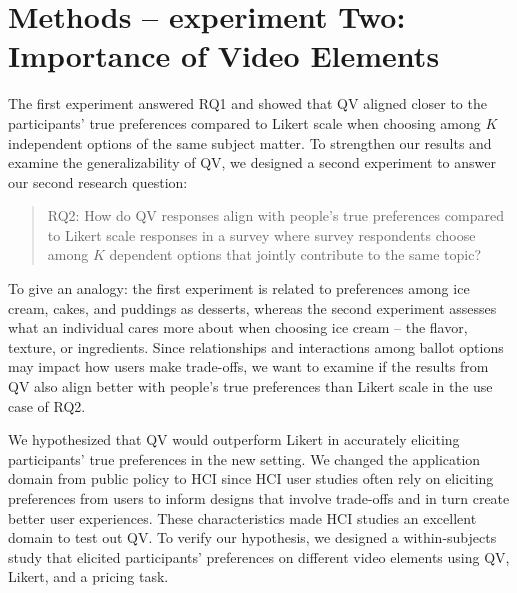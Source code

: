 \section{Methods -- experiment Two: Importance of Video Elements}
\label{method-2}
The first experiment answered RQ1 and showed that QV aligned closer to the participants' true preferences compared to Likert scale when choosing among $K$ independent options of the same subject matter. To strengthen our results and examine the generalizability of QV, we designed a second experiment to answer our second research question: \begin{quote}RQ2: How do QV responses align with people's true preferences compared to Likert scale responses in a survey where survey respondents choose among $K$ dependent options that jointly contribute to the same topic?\end{quote} To give an analogy: the first experiment is related to preferences among ice cream, cakes, and puddings as desserts, whereas the second experiment assesses what an individual cares more about when choosing ice cream -- the flavor, texture, or ingredients. Since relationships and interactions among ballot options may impact how users make trade-offs, we want to examine if the results from QV also align better with people's true preferences than Likert scale in the use case of RQ2.

We hypothesized that QV would outperform Likert in accurately eliciting participants' true preferences in the new setting. We changed the application domain from public policy to HCI since HCI user studies often rely on eliciting preferences from users to inform designs that involve trade-offs and in turn create better user experiences. These characteristics made HCI studies an excellent domain to test out QV. To verify our hypothesis, we designed a within-subjects study that elicited participants' preferences on different video elements using QV, Likert, and a pricing task. 


